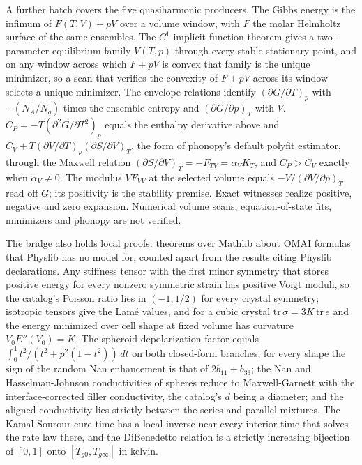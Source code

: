 \documentclass[11pt,a4paper]{article}
\begin{document}
A further batch covers the five quasiharmonic producers. The Gibbs energy is the infimum of $F(T,V) + pV$ over a volume window, with $F$ the molar Helmholtz surface of the same ensembles. The $C^1$ implicit-function theorem gives a two-parameter equilibrium family $V(T,p)$ through every stable stationary point, and on any window across which $F + pV$ is convex that family is the unique minimizer, so a scan that verifies the convexity of $F + pV$ across its window selects a unique minimizer. The envelope relations identify $(\partial G/\partial T)_p$ with $-(N_A/N_q)$ times the ensemble entropy and $(\partial G/\partial p)_T$ with $V$. $C_P = -T(\partial^2 G/\partial T^2)_p$ equals the enthalpy derivative above and $C_V + T(\partial V/\partial T)_p(\partial S/\partial V)_T$, the form of phonopy's default polyfit estimator, through the Maxwell relation $(\partial S/\partial V)_T = -F_{TV} = \alpha_V K_T$, and $C_P > C_V$ exactly when $\alpha_V \neq 0$. The modulus $V F_{VV}$ at the selected volume equals $-V/(\partial V/\partial p)_T$ read off $G$; its positivity is the stability premise. Exact witnesses realize positive, negative and zero expansion. Numerical volume scans, equation-of-state fits, minimizers and phonopy are not verified.

The bridge also holds local proofs: theorems over Mathlib about OMAI formulas that Physlib has no model for, counted apart from the results citing Physlib declarations. Any stiffness tensor with the first minor symmetry that stores positive energy for every nonzero symmetric strain has positive Voigt moduli, so the catalog's Poisson ratio lies in $(-1, 1/2)$ for every crystal symmetry; isotropic tensors give the Lam\'e values, and for a cubic crystal $\mathrm{tr}\,\sigma = 3K\,\mathrm{tr}\,e$ and the energy minimized over cell shape at fixed volume has curvature $V_0 E''(V_0) = K$. The spheroid depolarization factor equals $\int_0^1 t^2/(t^2 + p^2(1-t^2))\,dt$ on both closed-form branches; for every shape the sign of the random Nan enhancement is that of $2b_{11} + b_{33}$; the Nan and Hasselman-Johnson conductivities of spheres reduce to Maxwell-Garnett with the interface-corrected filler conductivity, the catalog's $d$ being a diameter; and the aligned conductivity lies strictly between the series and parallel mixtures. The Kamal-Sourour cure time has a local inverse near every interior time that solves the rate law there, and the DiBenedetto relation is a strictly increasing bijection of $[0, 1]$ onto $[T_{g0}, T_{g\infty}]$ in kelvin.
\end{document}
